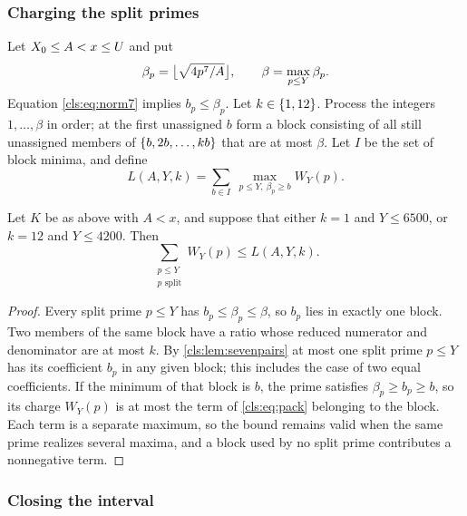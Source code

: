 \subsubsection*{Charging the split primes}
Let $\clsXz\le A<x\le U$ and put
\[
  \beta_p=\floor[\big]{\sqrt{4p^7/A}},\qquad \beta=\max_{p\le Y}\beta_p .
\]
Equation \eqref{cls:eq:norm7} implies $b_p\le\beta_p$. Let $k\in\set{1,12}$. Process the
integers $1,\dots,\beta$ in order; at the first unassigned $b$ form a block consisting of
all still unassigned members of $\set{b,2b,\dots,kb}$ that are at most $\beta$. Let $I$
be the set of block minima, and define
\begin{equation}\label{cls:eq:pack}
 L(A,Y,k)=\sum_{b\in I}\ \max_{p\le Y,\ \beta_p\ge b}W_Y(p) .
\end{equation}

\begin{lemma}\label{cls:lem:charge}
Let $K$ be as above with $A<x$, and suppose that either $k=1$ and $Y\le6500$, or $k=12$
and $Y\le4200$. Then
\[
   \sum_{\substack{p\le Y\\ p\text{ split}}}W_Y(p)\le L(A,Y,k).
\]
\end{lemma}

\begin{proof}
Every split prime $p\le Y$ has $b_p\le\beta_p\le\beta$, so $b_p$ lies in exactly one
block. Two members of the same block have a ratio whose reduced numerator and denominator
are at most $k$. By \cref{cls:lem:sevenpairs} at most one split prime $p\le Y$ has its
coefficient $b_p$ in any given block; this includes the case of two equal coefficients.
If the minimum of that block is $b$, the prime satisfies $\beta_p\ge b_p\ge b$, so its
charge $W_Y(p)$ is at most the term of \eqref{cls:eq:pack} belonging to the block. Each
term is a separate maximum, so the bound remains valid when the same prime realizes
several maxima, and a block used by no split prime contributes a nonnegative term.
\end{proof}

\subsubsection*{Closing the interval}

